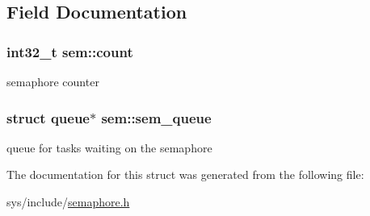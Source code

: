 \subsection{Field Documentation}
\hypertarget{structsem_a798dc7e825b1e632b2db49b473b17636}{
\subsubsection[{count}]{\setlength{\rightskip}{0pt plus 5cm}int32\-\_\-t sem\-::count}}\label{structsem_a798dc7e825b1e632b2db49b473b17636}
semaphore counter \hypertarget{structsem_a723ac960b2566b855b905fa4aa324f9b}{
\subsubsection[{sem\-\_\-queue}]{\setlength{\rightskip}{0pt plus 5cm}struct {\bf queue}$\ast$ sem\-::sem\-\_\-queue}}\label{structsem_a723ac960b2566b855b905fa4aa324f9b}
queue for tasks waiting on the semaphore 

The documentation for this struct was generated from the following file\-:\begin{DoxyCompactItemize}
\item 
sys/include/\hyperlink{semaphore_8h}{semaphore.\-h}\end{DoxyCompactItemize}
